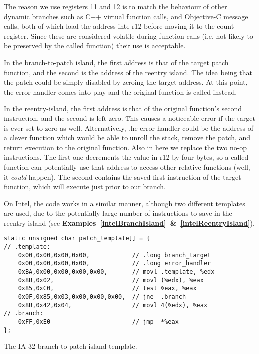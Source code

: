 \documentclass[english]{article}
\begin{document}
The reason we use registers 11 and 12 is to match the behaviour of other dynamic branches such as C++ virtual function calls, and Objective-C message calls, both of which load the address into r12 before moving it to the count register. Since these are considered volatile during function calls (i.e. not likely to be preserved by the called function) their use is acceptable.

In the branch-to-patch island, the first address is that of the target patch function, and the second is the address of the reentry island. The idea being that the patch could be simply disabled by zeroing the target address. At this point, the error handler comes into play and the original function is called instead.

In the reentry-island, the first address is that of the original function's second instruction, and the second is left zero. This causes a noticeable error if the target is ever set to zero as well. Alternatively, the error handler could be the address of a clever function which would be able to unroll the stack, remove the patch, and return execution to the original function.
Also in here we replace the two no-op instructions. The first one decrements the value in r12 by four bytes, so a called function can potentially use that address to access other relative functions (well, it \emph{could} happen). The second contains the saved first instruction of the target function, which will execute just prior to our branch.

On Intel, the code works in a similar manner, although two different templates are used, due to the potentially large number of instructions to save in the reentry island (see \textbf{Examples~\ref{intelBranchIsland}~\&~\ref{intelReentryIsland}}).

\begin{sourcecode}
\begin{verbatim}
static unsigned char patch_template[] = {
// .template:
    0x00,0x00,0x00,0x00,            // .long branch_target
    0x00,0x00,0x00,0x00,            // .long error_handler
    0xBA,0x00,0x00,0x00,0x00,       // movl .template, %edx
    0x8B,0x02,                      // movl (%edx), %eax
    0x85,0xC0,                      // test %eax, %eax
    0x0F,0x85,0x03,0x00,0x00,0x00,  // jne  .branch
    0x8B,0x42,0x04,                 // movl 4(%edx), %eax
// .branch:
    0xFF,0xE0                       // jmp  *%eax
};
\end{verbatim}
\caption{The IA-32 branch-to-patch island template.}
\label{intelBranchIsland}
\end{sourcecode}
\end{document}
